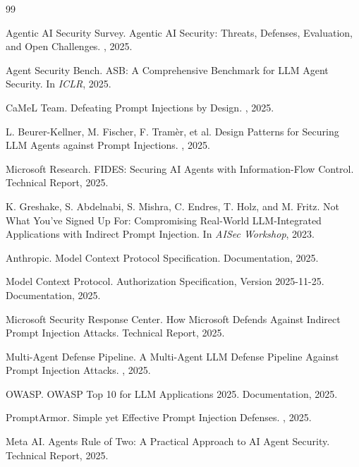 \documentclass[11pt]{book}
\begin{document}
\begin{thebibliography}{99}

Agentic AI Security Survey.
\newblock Agentic AI Security: Threats, Defenses, Evaluation, and Open Challenges.
, 2025.

Agent Security Bench.
\newblock ASB: A Comprehensive Benchmark for LLM Agent Security.
\newblock In {\em ICLR}, 2025.

CaMeL Team.
\newblock Defeating Prompt Injections by Design.
, 2025.

L. Beurer-Kellner, M. Fischer, F. Tramèr, et al.
\newblock Design Patterns for Securing LLM Agents against Prompt Injections.
, 2025.

Microsoft Research.
\newblock FIDES: Securing AI Agents with Information-Flow Control.
\newblock Technical Report, 2025.

K. Greshake, S. Abdelnabi, S. Mishra, C. Endres, T. Holz, and M. Fritz.
\newblock Not What You've Signed Up For: Compromising Real-World LLM-Integrated Applications with Indirect Prompt Injection.
\newblock In {\em AISec Workshop}, 2023.

Anthropic.
\newblock Model Context Protocol Specification.
\newblock Documentation, 2025.

Model Context Protocol.
\newblock Authorization Specification, Version 2025-11-25.
\newblock Documentation, 2025.

Microsoft Security Response Center.
\newblock How Microsoft Defends Against Indirect Prompt Injection Attacks.
\newblock Technical Report, 2025.

Multi-Agent Defense Pipeline.
\newblock A Multi-Agent LLM Defense Pipeline Against Prompt Injection Attacks.
, 2025.

OWASP.
\newblock OWASP Top 10 for LLM Applications 2025.
\newblock Documentation, 2025.

PromptArmor.
\newblock Simple yet Effective Prompt Injection Defenses.
, 2025.

Meta AI.
\newblock Agents Rule of Two: A Practical Approach to AI Agent Security.
\newblock Technical Report, 2025.


\end{thebibliography}
\end{document}
